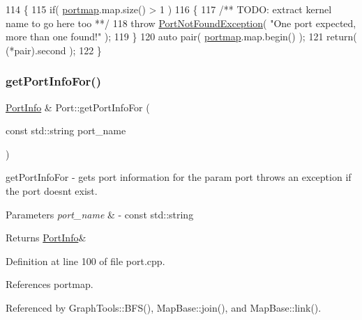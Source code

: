 \begin{DoxyCode}
114 \{
115    \textcolor{keywordflow}{if}( \hyperlink{class_port_a537a8a0c2a47acbf8654f286200aee90}{portmap}.map.size() > 1 )
116    \{\textcolor{comment}{}
117 \textcolor{comment}{      /** TODO: extract kernel name to go here too **/}
118       \textcolor{keywordflow}{throw} \hyperlink{class_port_not_found_exception}{PortNotFoundException}( \textcolor{stringliteral}{"One port expected, more than one found!"} );
119    \}
120    \textcolor{keyword}{auto} pair( \hyperlink{class_port_a537a8a0c2a47acbf8654f286200aee90}{portmap}.map.begin() );
121    \textcolor{keywordflow}{return}( (*pair).second );
122 \}
\end{DoxyCode}
\hypertarget{class_port_afb426a015195fa9b4b5b1d1200daf8ed}{}\label{class_port_afb426a015195fa9b4b5b1d1200daf8ed} 
\subsubsection{\texorpdfstring{get\+Port\+Info\+For()}{getPortInfoFor()}}
{\footnotesize\ttfamily \hyperlink{struct_port_info}{Port\+Info} \& Port\+::get\+Port\+Info\+For (\begin{DoxyParamCaption}\item[{const std\+::string}]{port\+\_\+name }\end{DoxyParamCaption})\hspace{0.3cm}{\ttfamily [protected]}}

get\+Port\+Info\+For -\/ gets port information for the param port throws an exception if the port doesn\textquotesingle{}t exist. 
\begin{DoxyParams}{Parameters}
{\em port\+\_\+name} & -\/ const std\+::string \\
\hline
\end{DoxyParams}
\begin{DoxyReturn}{Returns}
\hyperlink{struct_port_info}{Port\+Info}\& 
\end{DoxyReturn}


Definition at line 100 of file port.\+cpp.



References portmap.



Referenced by Graph\+Tools\+::\+B\+F\+S(), Map\+Base\+::join(), and Map\+Base\+::link().


